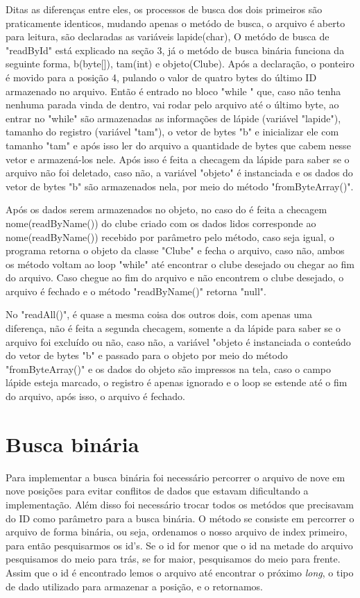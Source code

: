 \documentclass[12pt]{article}
\begin{document}
Ditas as diferenças entre eles, os processos de busca dos dois primeiros são praticamente identicos, mudando apenas o metódo de busca, o arquivo é aberto para leitura, são declaradas as variáveis lapide(char), O metódo de busca de "readById" está explicado na seção 3, já o metódo de busca binária funciona da seguinte forma, b(byte[]), tam(int) e objeto(Clube). Após a declaração, o ponteiro é movido para a posição 4, pulando o valor de quatro bytes do último ID armazenado no arquivo. Então é entrado no bloco "while {}" que, caso não tenha nenhuma parada vinda de dentro, vai rodar pelo arquivo até o último byte, ao entrar no "while" são armazenadas as informações de lápide (variável "lapide"), tamanho do registro (variável "tam"), o vetor de bytes "b" e inicializar ele com tamanho "tam" e após isso ler do arquivo a quantidade de bytes que cabem nesse vetor e armazená-los nele. Após isso é feita a checagem da lápide para saber se o arquivo não foi deletado, caso não, a variável "objeto" é instanciada e os dados do vetor de bytes "b" são armazenados nela, por meio do método "fromByteArray()". 

Após os dados serem armazenados no objeto, no caso do é feita a checagem nome(readByName()) do clube criado com os dados lidos corresponde ao nome(readByName()) recebido por parâmetro pelo método, caso seja igual, o programa retorna o objeto da classe "Clube" e fecha o arquivo, caso não, ambos os método voltam ao loop "while" até encontrar o clube desejado ou chegar ao fim do arquivo.
Caso chegue ao fim do arquivo e não encontrem o clube desejado, o arquivo é fechado e o método "readByName()" retorna "null".

No "readAll()", é quase a mesma coisa dos outros dois, com apenas uma diferença, não é feita a segunda checagem, somente a da lápide para saber se o arquivo foi excluído ou não, caso não, a variável "objeto é instanciada o conteúdo do vetor de bytes "b" e passado para o objeto por meio do método "fromByteArray()" e os dados do objeto são impressos na tela, caso o campo lápide esteja marcado, o registro é apenas ignorado e o loop se estende até o fim do arquivo, após isso, o arquivo é fechado.

\section{Busca binária}
Para implementar a busca binária foi necessário percorrer o arquivo de nove em nove posições para evitar conflitos de dados que estavam dificultando a implementação. Além disso foi necessário trocar todos os metódos que precisavam do ID como parâmetro para a busca binária. O método se consiste em percorrer o arquivo de forma binária, ou seja, ordenamos o nosso arquivo de index primeiro, para então pesquisarmos os id's. Se o id for menor que o id na metade do arquivo pesquisamos do meio para trás, se for maior,  pesquisamos do meio para frente. Assim que o id é encontrado lemos o arquivo até encontrar o próximo \textit{long}, o tipo de dado utilizado para armazenar a posição, e o retornamos. 
\end{document}
